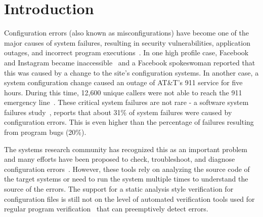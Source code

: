 \section{Introduction}
\label{sec-intro}

Configuration errors (also known as misconfigurations) have become
one of the major causes of system failures, resulting in security vulnerabilities,
application outages, and incorrect program executions~\cite{xu15systems, xu13do, xu15hey}. 
In one high profile case,  
Facebook and Instagram became inaccessible~\cite{mashableNews}
and a Facebook spokeswoman reported that 
this was caused by a change to the site's configuration systems.
In another case, a system configuration change caused an outage of AT\&T's 911 service for five hours.
During this time, 12,600 unique callers were not able to reach the 911 emergency line~\cite{att-outage}.
These critical system failures are not rare -
a software system failures study~\cite{yin11anempirical},
reports that about 31\% of system failures were caused by 
configuration errors.
This is even higher than the percentage of failures resulting from program bugs (20\%).

The systems research community has recognized this as an important
problem and many efforts have been proposed to
check, troubleshoot, and diagnose configuration 
errors~\cite{attariyan10automating,
su07autobash, whitaker04configuration,xu16early}.
However, these tools rely on analyzing the source code of 
the target systems or need to run the system
multiple times to understand the source of the errors.
The support for a static analysis style verification for configuration files
is still not on the level of
automated verification tools used for regular program 
verification~\cite{Leino10Dafny, PiskacWZ14, BobotFMP15} that can
preemptively detect errors. 

